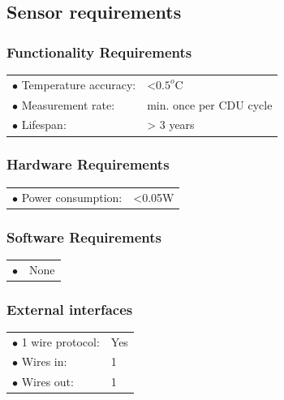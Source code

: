 \subsection{Sensor requirements}

\subsubsection{Functionality Requirements}
\begin{table}[H]
\begin{tabular}{p{8cm} p{5cm}}
$\bullet$ Temperature accuracy: & <$0.5^o$C\\
$\bullet$ Measurement rate: & min. once per CDU cycle\\
$\bullet$ Lifespan: & > 3 years\\
\end{tabular}
\end{table}

\subsubsection{Hardware Requirements}
\begin{table}[H]
\begin{tabular}{p{8cm} p{2cm}}
$\bullet$ Power consumption: & <0.05W\\


\end{tabular}
\end{table}


\subsubsection{Software Requirements}
\begin{table}[H]
\begin{tabular}{p{8cm} p{2cm}}
$\bullet$ & None\\


\end{tabular}
\end{table}


\subsubsection{External interfaces}
\begin{table}[H]
\begin{tabular}{p{8cm} p{2cm}}
$\bullet$ 1 wire protocol: & Yes\\
$\bullet$ Wires in: & 1\\
$\bullet$ Wires out: & 1\\
\end{tabular}
\end{table}

